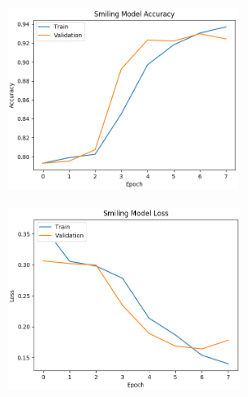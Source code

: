 \documentclass[10pt,twocolumn,letterpaper]{article}
\begin{document}
\begin{figure}[!htbp]
  \centering
  \vspace*{-2cm}
  \begin{subfigure}[t]{.45\linewidth}
    \centering
    \includegraphics[width=\linewidth, height=4.8cm]{Smiling_model_accuracy.png}
  \end{subfigure}
  \hfill
  \begin{subfigure}[t]{.45\linewidth}
    \centering
    \includegraphics[width=\linewidth, height=4.8cm]{Smiling_model_loss.png}
  \end{subfigure}


\end{figure}
\end{document}
